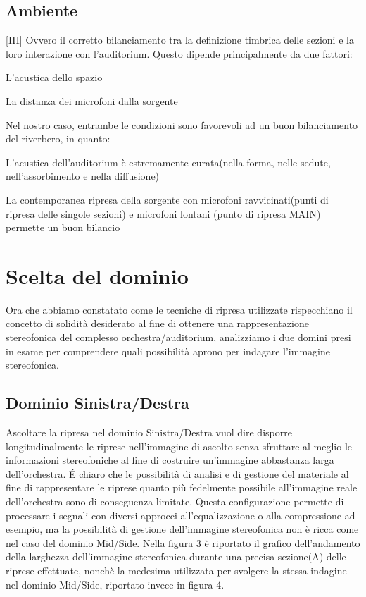 \subsection*{Ambiente}[III]
Ovvero il corretto bilanciamento tra la definizione timbrica delle sezioni e la loro interazione con l'auditorium. Questo dipende principalmente da due fattori:
\begin{compactitem}
	\item L'acustica dello spazio
	\item La distanza dei microfoni dalla sorgente
\end{compactitem}
Nel nostro caso, entrambe le condizioni sono favorevoli ad un buon bilanciamento del riverbero, in quanto:
\begin{compactitem}
	\item L'acustica dell'auditorium è estremamente curata(nella forma, nelle sedute, nell'assorbimento e nella diffusione)
	\item La contemporanea ripresa della sorgente con microfoni ravvicinati(punti di ripresa delle singole sezioni) e microfoni lontani (punto di ripresa MAIN) permette un buon bilancio
\end{compactitem}

\section*{Scelta del dominio}
Ora che abbiamo constatato come le tecniche di ripresa utilizzate rispecchiano il concetto di solidità desiderato al fine di ottenere una rappresentazione stereofonica del complesso orchestra/auditorium, analizziamo i due domini presi in esame per comprendere quali possibilità aprono per indagare l'immagine stereofonica.

\subsection*{Dominio Sinistra/Destra}
Ascoltare la ripresa nel dominio Sinistra/Destra vuol dire disporre longitudinalmente le riprese nell'immagine di ascolto senza sfruttare al meglio le informazioni stereofoniche al fine di costruire un'immagine abbastanza larga dell'orchestra.
É chiaro che le possibilità di analisi e di gestione del materiale al fine di rappresentare le riprese quanto più fedelmente possibile all'immagine reale dell'orchestra sono di conseguenza limitate.
Questa configurazione permette di processare i segnali con diversi approcci all'equalizzazione o alla compressione ad esempio, ma la possibilità di gestione dell'immagine stereofonica non è ricca come nel caso del dominio Mid/Side.
Nella figura 3 è riportato il grafico dell'andamento della larghezza dell'immagine stereofonica durante una precisa sezione(A) delle riprese effettuate, nonchè la medesima utilizzata per svolgere la stessa indagine nel dominio Mid/Side, riportato invece in figura 4.

